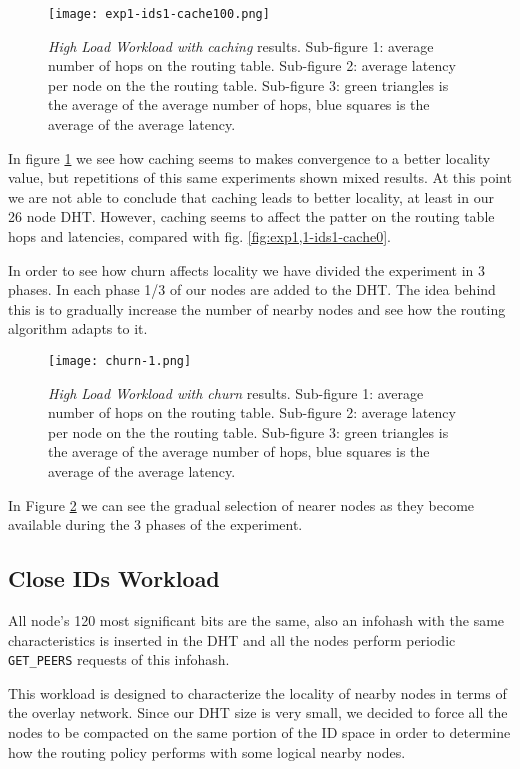 \documentclass[conference]{IEEEtran}
\begin{document}
\begin{figure}
    \texttt{[image: exp1-ids1-cache100.png]}
    \caption{\textit{High Load Workload with caching} results. Sub-figure 1: average number of hops on the routing table. Sub-figure 2: average latency per node on the the routing table. Sub-figure 3: green triangles is the average of the average number of hops, blue squares is the average of the average latency.}
    \label{fig:exp1-ids1-cache100}
\end{figure}

In figure \ref{fig:exp1-ids1-cache100} we see how caching seems to makes convergence to a better locality value, but repetitions of this same experiments shown mixed results. At this point we are not able to conclude that caching leads to better locality, at least in our 26 node DHT. However, caching seems to affect the patter on the routing table hops and latencies, compared with fig. \ref{fig:exp1,1-ids1-cache0}.

In order to see how churn affects locality we have divided the experiment in 3 phases. In each phase 1/3 of our nodes are added to the DHT. The idea behind this is to gradually increase the number of nearby nodes and see how the routing algorithm adapts to it.

\begin{figure}
    \texttt{[image: churn-1.png]}
    \caption{\textit{High Load Workload with churn} results. Sub-figure 1: average number of hops on the routing table. Sub-figure 2: average latency per node on the the routing table. Sub-figure 3: green triangles is the average of the average number of hops, blue squares is the average of the average latency.}
    \label{fig:churn-1}
\end{figure}

In Figure \ref{fig:churn-1} we can see the gradual selection of nearer nodes as they become available during the 3 phases of the experiment.

\subsection{Close IDs Workload}

All node's 120 most significant bits are the same, also an infohash with the same characteristics is inserted in the DHT and all the nodes perform periodic \texttt{GET\_PEERS} requests of this infohash.

This workload is designed to characterize the locality of nearby nodes in terms of the overlay network. Since our DHT size is very small, we decided to force all the nodes to be compacted on the same portion of the ID space in order to determine how the routing policy performs with some logical nearby nodes.
\end{document}
